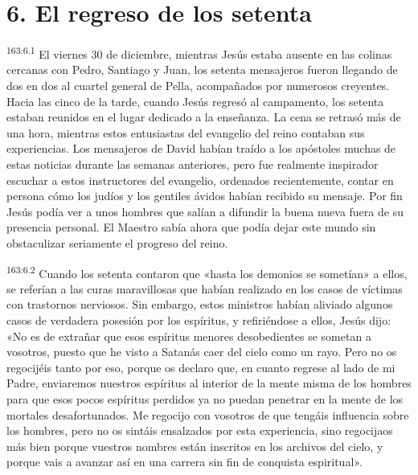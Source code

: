 \section*{6. El regreso de los setenta}
\par 
\textsuperscript{163:6.1} El viernes 30 de diciembre, mientras Jesús estaba ausente en las colinas cercanas con Pedro, Santiago y Juan, los setenta mensajeros fueron llegando de dos en dos al cuartel general de Pella, acompañados por numerosos creyentes. Hacia las cinco de la tarde, cuando Jesús regresó al campamento, los setenta estaban reunidos en el lugar dedicado a la enseñanza. La cena se retrasó más de una hora, mientras estos entusiastas del evangelio del reino contaban sus experiencias. Los mensajeros de David habían traído a los apóstoles muchas de estas noticias durante las semanas anteriores, pero fue realmente inspirador escuchar a estos instructores del evangelio, ordenados recientemente, contar en persona cómo los judíos y los gentiles ávidos habían recibido su mensaje. Por fin Jesús podía ver a unos hombres que salían a difundir la buena nueva fuera de su presencia personal. El Maestro sabía ahora que podía dejar este mundo sin obstaculizar seriamente el progreso del reino.

\par 
\textsuperscript{163:6.2} Cuando los setenta contaron que «hasta los demonios se sometían» a ellos, se referían a las curas maravillosas que habían realizado en los casos de víctimas con trastornos nerviosos. Sin embargo, estos ministros habían aliviado algunos casos de verdadera posesión por los espíritus, y refiriéndose a ellos, Jesús dijo: «No es de extrañar que esos espíritus menores desobedientes se sometan a vosotros, puesto que he visto a Satanás caer del cielo como un rayo. Pero no os regocijéis tanto por eso, porque os declaro que, en cuanto regrese al lado de mi Padre, enviaremos nuestros espíritus al interior de la mente misma de los hombres para que esos pocos espíritus perdidos ya no puedan penetrar en la mente de los mortales desafortunados. Me regocijo con vosotros de que tengáis influencia sobre los hombres, pero no os sintáis ensalzados por esta experiencia, sino regocijaos más bien porque vuestros nombres están inscritos en los archivos del cielo, y porque vais a avanzar así en una carrera sin fin de conquista espiritual».

